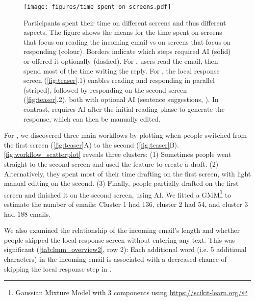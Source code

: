 \begin{figure}
    \centering
    \texttt{[image: figures/time\_spent\_on\_screens.pdf]}
    \caption{Participants spent their time on different screens and thus different aspects. The figure shows the means for the time spent on screens that focus on reading the incoming email vs on screens that focus on responding (colour). Borders indicate which steps required AI (solid) or offered it optionally (dashed). For \textit{\modemanual}, users read the email, then spend most of the time writing the reply. For \textit{\modeours}, the local response screen (\cref{fig:teaser}.1) enables reading and responding in parallel (striped), followed by responding on the second screen (\cref{fig:teaser}.2), both with optional AI (sentence suggestions, \imppass{}). In contrast, \textit{\modemail} requires AI after the initial reading phase to generate the response, which can then be manually edited.}
    \label{fig:time_spent_on_screens_barplot}
\end{figure}

For \modeours, we discovered three main workflows by plotting when people switched from the first screen (\cref{fig:teaser}A) to the second (\cref{fig:teaser}B). \cref{fig:workflow_scatterplot} reveals three clusters: (1) Sometimes people went straight to the second screen and used the \imppass{} feature to create a draft. (2) Alternatively, they spent most of their time drafting on the first screen, with light manual editing on the second. (3) Finally, people partially drafted on the first screen and finished it on the second screen, using AI.
We fitted a GMM\footnote{Gaussian Mixture Model with 3 components using \url{https://scikit-learn.org/}} to estimate the number of emails: Cluster 1 had 136, cluster 2 had 54, and cluster 3 had 188 emails.

We also examined the relationship of the incoming email's length and whether people skipped the local response screen without entering any text. This was significant (\cref{tab:lmm_overview2}, row 2): Each additional word (i.e. 5 additional characters) in the incoming email is associated with a  decreased chance of skipping the local response step in \modeours{}. 


